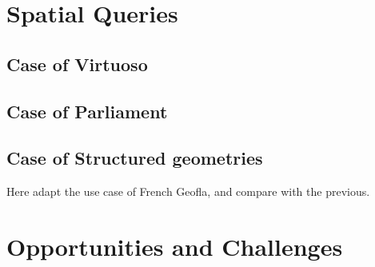 \begin{itemize}
\begin{figure}[h!t]
\end{figure}

\section{Spatial Queries}
\label{sec:geoqueries}

\subsection{Case of Virtuoso}

\subsection{Case of Parliament}

\subsection{Case of Structured geometries}
Here adapt the use case of French Geofla, and compare with the previous.
 

\section{Opportunities and Challenges}\label{sec:challenges}


\end{itemize}
